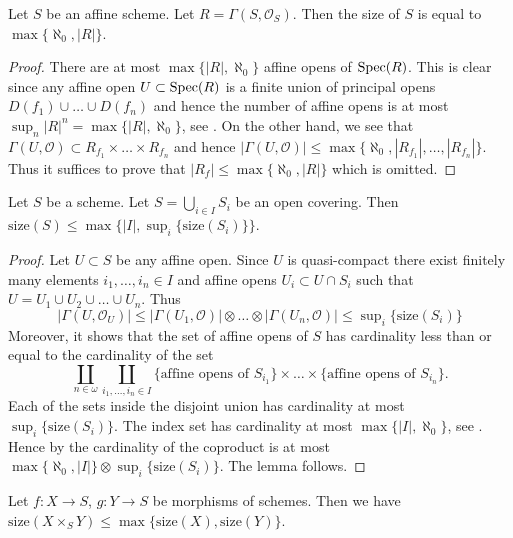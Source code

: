 \begin{lemma}
\label{lemma-bound-affine}
Let $S$ be an affine scheme.
Let $R = \Gamma(S, \mathcal{O}_S)$.
Then the size of $S$ is equal to $\max\{ \aleph_0, |R|\}$.
\end{lemma}

\begin{proof}
There are at most $\max\{|R|, \aleph_0\}$ affine opens of
$\mathop{\mathrm{Spec}}(R)$. This is clear since any affine open
$U \subset \mathop{\mathrm{Spec}}(R)$ is a finite union of principal
opens $D(f_1) \cup \ldots \cup D(f_n)$ and hence the number
of affine opens is at most $\sup_n |R|^n = \max\{|R|, \aleph_0\}$,
see \cite[Ch. I, 10.13]{Kunen}. On the other hand, we see that
$\Gamma(U, \mathcal{O}) \subset R_{f_1} \times \ldots \times R_{f_n}$
and hence $|\Gamma(U, \mathcal{O})| \leq
\max\{\aleph_0, |R_{f_1}|, \ldots, |R_{f_n}|\}$. Thus
it suffices to prove that $|R_f| \leq \max\{\aleph_0, |R|\}$
which is omitted.
\end{proof}

\begin{lemma}
\label{lemma-bound-size}
Let $S$ be a scheme. Let $S = \bigcup_{i \in I} S_i$ be
an open covering. Then
$\text{size}(S) \leq \max\{|I|, \sup_i\{\text{size}(S_i)\}\}$.
\end{lemma}

\begin{proof}
Let $U \subset S$ be any affine open. Since $U$ is quasi-compact
there exist finitely many elements $i_1, \ldots, i_n \in I$
and affine opens $U_i \subset U \cap S_i$ such that
$U = U_1 \cup U_2 \cup \ldots \cup U_n$. Thus
$$
|\Gamma(U, \mathcal{O}_U)|
\leq
|\Gamma(U_1, \mathcal{O})|
\otimes
\ldots
\otimes
|\Gamma(U_n, \mathcal{O})|
\leq \sup\nolimits_i\{\text{size}(S_i)\}
$$
Moreover, it shows that the set of affine opens of $S$ has
cardinality less than or equal to the cardinality of the set
$$
\coprod_{n \in \omega}
\coprod_{i_1, \ldots, i_n \in I}
\{\text{affine opens of }S_{i_1}\}
\times
\ldots
\times
\{\text{affine opens of }S_{i_n}\}.
$$
Each of the sets inside the disjoint union has cardinality at most
$\sup_i\{\text{size}(S_i)\}$. The index set has cardinality at most
$\max\{|I|, \aleph_0\}$, see \cite[Ch. I, 10.13]{Kunen}.
Hence by \cite[Lemma 5.8]{Jech} the cardinality
of the coproduct is at most $\max\{\aleph_0, |I|\}
\otimes \sup_i\{\text{size}(S_i)\}$. The lemma follows.
\end{proof}

\begin{lemma}
\label{lemma-bound-size-fibre-product}
Let $f : X \to S$, $g : Y \to S$ be morphisms of schemes.
Then we have
$\text{size}(X \times_S Y) \leq \max\{\text{size}(X), \text{size}(Y)\}$.
\end{lemma}

